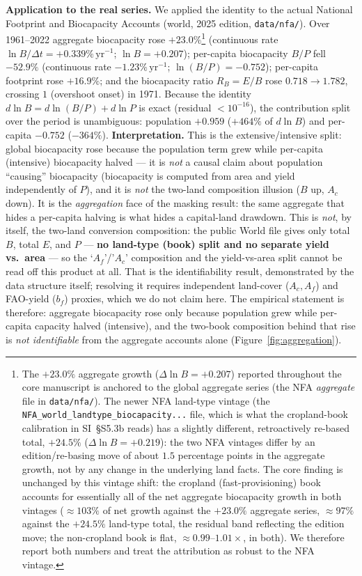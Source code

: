 \documentclass[11pt]{article}
\begin{document}
\noindent\textbf{Application to the real series.} We applied the identity to the actual National Footprint and Biocapacity Accounts (world, 2025 edition, \texttt{data/nfa/}). Over 1961--2022 aggregate biocapacity rose $+23.0\%$\footnote{The $+23.0\%$ aggregate growth ($\Delta\ln B=+0.207$) reported throughout the core manuscript is anchored to the global aggregate series (the NFA \emph{aggregate} file in \texttt{data/nfa/}). The newer NFA land-type vintage (the \texttt{NFA\_world\_landtype\_biocapacity...} file, which is what the cropland-book calibration in SI~§S5.3b reads) has a slightly different, retroactively re-based total, $+24.5\%$ ($\Delta\ln B=+0.219$): the two NFA vintages differ by an edition/re-basing move of about $1.5$ percentage points in the aggregate growth, not by any change in the underlying land facts. The core finding is unchanged by this vintage shift: the cropland (fast-provisioning) book accounts for essentially all of the net aggregate biocapacity growth in both vintages ($\approx103\%$ of net growth against the $+23.0\%$ aggregate series, $\approx97\%$ against the $+24.5\%$ land-type total, the residual band reflecting the edition move; the non-cropland book is flat, $\approx0.99$--$1.01\times$, in both). We therefore report both numbers and treat the attribution as robust to the NFA vintage.} (continuous rate $\ln B/\Delta t=+0.339\%\,\text{yr}^{-1}$; $\ln B=+0.207$); per-capita biocapacity $B/P$ fell $-52.9\%$ (continuous rate $-1.23\%\,\text{yr}^{-1}$; $\ln(B/P)=-0.752$); per-capita footprint rose $+16.9\%$; and the biocapacity ratio $R_B=E/B$ rose $0.718\to1.782$, crossing $1$ (overshoot onset) in 1971. Because the identity $d\ln B=d\ln(B/P)+d\ln P$ is exact (residual $<10^{-16}$), the contribution split over the period is unambiguous: population $+0.959$ ($+464\%$ of $d\ln B$) and per-capita $-0.752$ ($-364\%$). \textbf{Interpretation.} This is the extensive/intensive split: global biocapacity rose because the population term grew while per-capita (intensive) biocapacity halved --- it is \emph{not} a causal claim about population ``causing'' biocapacity (biocapacity is computed from area and yield independently of $P$), and it is \emph{not} the two-land composition illusion ($B$ up, $A_c$ down). It is the \emph{aggregation} face of the masking result: the same aggregate that hides a per-capita halving is what hides a capital-land drawdown. This is \emph{not}, by itself, the two-land conversion composition: the public World file gives only total $B$, total $E$, and $P$ --- \textbf{no land-type (book) split and no separate yield vs.\ area} --- so the `$A_f$'/'$A_c$' composition and the yield-vs-area split cannot be read off this product at all. That is the identifiability result, demonstrated by the data structure itself; resolving it requires independent land-cover ($A_c,A_f$) and FAO-yield ($b_f$) proxies, which we do not claim here. The empirical statement is therefore: aggregate biocapacity rose only because population grew while per-capita capacity halved (intensive), and the two-book composition behind that rise is \emph{not identifiable} from the aggregate accounts alone (Figure~\ref{fig:aggregation}).
\end{document}
